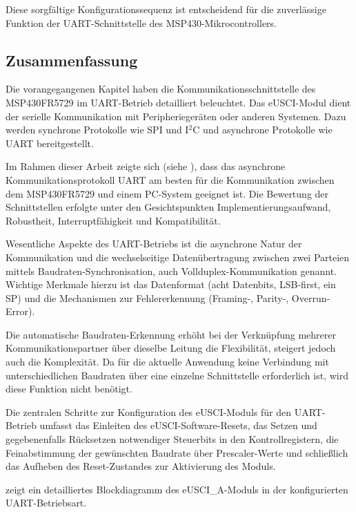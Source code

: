 Diese sorgf\"altige Konfigurationssequenz ist entscheidend f\"ur die zuverl\"assige Funktion der UART-Schnittstelle des MSP430-Mikrocontrollers.

\newpage
\subsection{Zusammenfassung}
\label{sec:eUSCI_Zusammenfassung}

Die vorangegangenen Kapitel haben die Kommunikationsschnittstelle des MSP430FR5729 im UART-Betrieb detailliert beleuchtet. Das eUSCI-Modul dient der serielle Kommunikation mit Peripherieger\"aten oder anderen Systemen. Dazu werden synchrone Protokolle wie SPI und I$^{2}$C und asynchrone Protokolle wie UART bereitgestellt.

Im Rahmen dieser Arbeit zeigte sich (siehe ), dass das asynchrone Kommunikationsprotokoll UART am besten f\"ur die Kommunikation zwischen dem MSP430FR5729 und einem PC-System geeignet ist. Die Bewertung der Schnittstellen erfolgte unter den Gesichtspunkten Implementierungsaufwand, Robustheit, Interruptf\"ahigkeit und Kompatibilit\"at.

Wesentliche Aspekte des UART-Betriebs ist die asynchrone Natur der Kommunikation und die wechselseitige Daten\"ubertragung zwischen zwei Parteien mittels Baudraten-Synchronisation, auch Vollduplex-Kommunikation genannt. Wichtige Merkmale hierzu ist das Datenformat (\zB acht Datenbits, LSB-first, ein SP) und die Mechanismen zur Fehlererkennung (\zB Framing-, Parity-, Overrun-Error).

Die automatische Baudraten-Erkennung erh\"oht bei der Verkn\"upfung mehrerer Kommunikationspartner \"uber dieselbe Leitung die Flexibilit\"at, steigert jedoch auch die Komplexit\"at. Da f\"ur die aktuelle Anwendung keine Verbindung mit unterschiedlichen Baudraten \"uber eine einzelne Schnittstelle erforderlich ist, wird diese Funktion nicht ben\"otigt.

Die zentralen Schritte zur Konfiguration des eUSCI-Moduls für den UART-Betrieb umfasst das Einleiten des eUSCI-Software-Resets, das Setzen und gegebenenfalls R\"ucksetzen notwendiger Steuerbits in den Kontrollregistern, die Feinabstimmung der gew\"unschten Baudrate \"uber Prescaler-Werte und schlie{\ss}lich das Aufheben des Reset-Zustandes zur Aktivierung des Moduls.

 zeigt ein detailliertes Blockdiagramm des eUSCI\_A-Moduls in der konfigurierten UART-Betriebsart.

